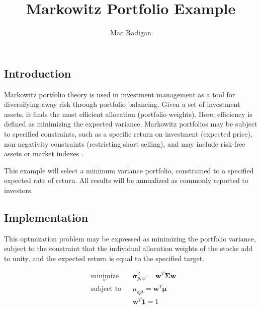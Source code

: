 \documentclass{article}[11pt]
\begin{document}
\title{Markowitz Portfolio Example}
\author{Mac Radigan}
\date{} %
\doublespacing

\maketitle




\subsection{Introduction}
Markowitz portfolio theory is used in investment management 
as a tool for diversifying away risk through portfolio balancing.
Given a set of investment assets, it finds the most efficient  
allocation (portfolio weights).  Here, efficiency is defined  
as minimizing the expected variance.  Markowitz portfolios
may be subject to specified constraints, such as a specific 
return on investment (expected price), non-negativity 
constraints (restricting short selling), and may include 
risk-free assets or market indexes \cite{WikiMPT}.
\newline

This example will select a minimum variance portfolio,
constrained to a specified expected rate of return.
All results will be annualized as commonly reported to
investors.
\newline

\subsection{Implementation}

This optmization problem may be expressed as minimizing the portfolio variance, 
subject to the constraint that the individual allocation weights of the stocks add to unity,
and the expected return is equal to the specified target.
\newline

\begin{equation*}
\begin{aligned}
& \underset{w}{\text{minimize}}
& & \mathbf{\sigma}_{p,w}^2 = \mathbf{w}^T \mathbf{\Sigma} \mathbf{w} \\
& \text{subject to}
& & \mu_{opt} = \mathbf{w}^T \mathbf{\mu} \\
&
& & \mathbf{w}^T \mathbf{\underline{1}} = 1
\end{aligned}
\label{eq:optimization_problem}
\end{equation*}
\end{document}
